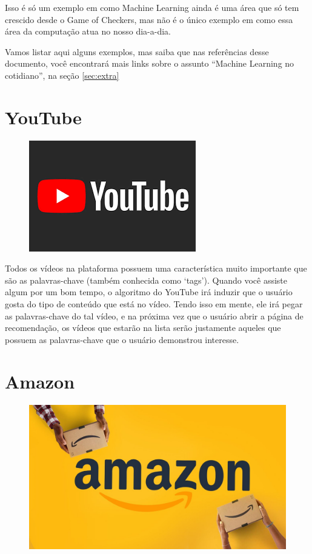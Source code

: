 \documentclass[12pt]{article}
\begin{document}
    Isso é só um exemplo em como Machine Learning ainda é uma área que só tem 
    crescido desde o Game of Checkers, mas não é o único exemplo em como essa 
    área da computação atua no nosso dia-a-dia.

    Vamos listar aqui alguns exemplos, mas saiba que nas referências desse 
    documento, você encontrará mais links sobre o assunto “Machine Learning 
    no cotidiano”, na seção \ref{sec:extra}

    \newpage
    \section{YouTube} 

    \begin{figure}[htp]
        \centering
        \includegraphics{youtube.png}
    \end{figure}

    Todos os vídeos na plataforma possuem uma característica muito importante que são as palavras-chave (também conhecida como ‘tags’). Quando você assiste algum por um bom tempo, o algoritmo do 
    YouTube irá induzir que o usuário gosta do tipo de conteúdo que está no vídeo. Tendo isso em mente, ele irá pegar as palavras-chave do tal vídeo, e na próxima vez que o usuário abrir a página 
    de recomendação, os vídeos que estarão na lista serão justamente aqueles que possuem as palavras-chave que o usuário demonstrou interesse.

    \newpage
    \section{Amazon}

    \begin{figure}[htp]
        \centering
        \includegraphics[scale=0.3]{amazon.jpg}
    \end{figure}
\end{document}
